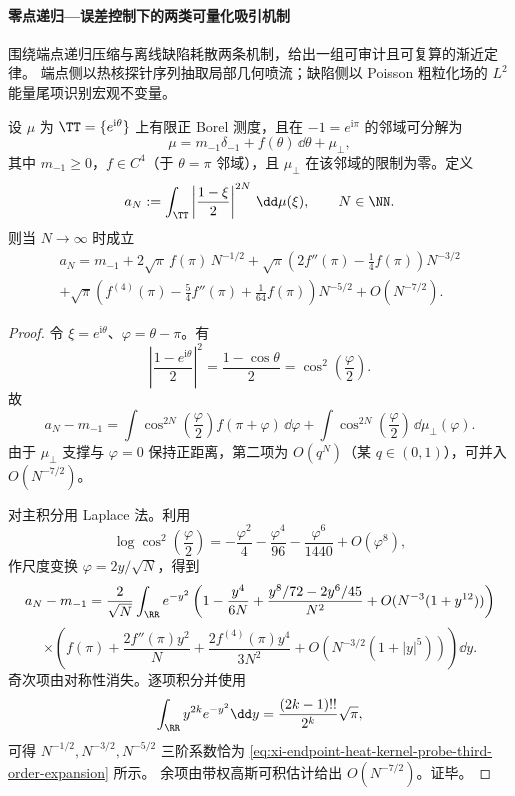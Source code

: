 \paragraph{零点递归—误差控制下的两类可量化吸引机制}
围绕端点递归压缩与离线缺陷耗散两条机制，给出一组可审计且可复算的渐近定律。
端点侧以热核探针序列抽取局部几何喷流；缺陷侧以 Poisson 粗粒化场的 \(L^2\) 能量尾项识别宏观不变量。

\begin{theorem}[端点热核探针的三阶渐近展开]\label{thm:xi-endpoint-heat-kernel-probe-third-order-expansion}
设 \(\mu\) 为 \(\TT=\{e^{\mathrm{i}\theta}\}\) 上有限正 Borel 测度，且在 \(-1=e^{\mathrm{i}\pi}\) 的邻域可分解为
\[
\mu=m_{-1}\delta_{-1}+f(\theta)\,\dd\theta+\mu_\perp,
\]
其中 \(m_{-1}\ge 0\)，\(f\in C^4\)（于 \(\theta=\pi\) 邻域），且 \(\mu_\perp\) 在该邻域的限制为零。定义
\[
a_N:=\int_{\TT}\left|\frac{1-\xi}{2}\right|^{2N}\,\dd\mu(\xi),\qquad N\in\NN.
\]
则当 \(N\to\infty\) 时成立
\begin{equation}\label{eq:xi-endpoint-heat-kernel-probe-third-order-expansion}
\begin{aligned}
a_N
=m_{-1}
+2\sqrt{\pi}\,f(\pi)\,N^{-1/2}
+\sqrt{\pi}\!\left(2f''(\pi)-\frac14 f(\pi)\right)N^{-3/2}\\
+\sqrt{\pi}\!\left(f^{(4)}(\pi)-\frac54 f''(\pi)+\frac1{64}f(\pi)\right)N^{-5/2}
+O(N^{-7/2}).
\end{aligned}
\end{equation}
\end{theorem}

\begin{proof}
令 \(\xi=e^{\mathrm{i}\theta}\)、\(\varphi=\theta-\pi\)。有
\[
\left|\frac{1-e^{\mathrm{i}\theta}}{2}\right|^2
=\frac{1-\cos\theta}{2}
=\cos^2\!\left(\frac{\varphi}{2}\right).
\]
故
\[
a_N-m_{-1}
=\int \cos^{2N}\!\left(\frac{\varphi}{2}\right)f(\pi+\varphi)\,\dd\varphi
+\int \cos^{2N}\!\left(\frac{\varphi}{2}\right)\,\dd\mu_\perp(\varphi).
\]
由于 \(\mu_\perp\) 支撑与 \(\varphi=0\) 保持正距离，第二项为 \(O(q^N)\)（某 \(q\in(0,1)\)），可并入 \(O(N^{-7/2})\)。

对主积分用 Laplace 法。利用
\[
\log\cos^2\!\left(\frac{\varphi}{2}\right)
=-\frac{\varphi^2}{4}-\frac{\varphi^4}{96}-\frac{\varphi^6}{1440}+O(\varphi^8),
\]
作尺度变换 \(\varphi=2y/\sqrt N\)，得到
\[
a_N-m_{-1}
=\frac{2}{\sqrt N}\int_{\RR}e^{-y^2}
\left(1-\frac{y^4}{6N}+\frac{y^8/72-2y^6/45}{N^2}+O(N^{-3}(1+y^{12}))\right)
\]
\[
\times
\left(
f(\pi)+\frac{2f''(\pi)y^2}{N}+\frac{2f^{(4)}(\pi)y^4}{3N^2}
+O(N^{-3/2}(1+|y|^5))
\right)\dd y.
\]
奇次项由对称性消失。逐项积分并使用
\[
\int_{\RR}y^{2k}e^{-y^2}\dd y
=\frac{(2k-1)!!}{2^k}\sqrt\pi,
\]
可得 \(N^{-1/2},N^{-3/2},N^{-5/2}\) 三阶系数恰为 \eqref{eq:xi-endpoint-heat-kernel-probe-third-order-expansion} 所示。
余项由带权高斯可积估计给出 \(O(N^{-7/2})\)。证毕。
\end{proof}

